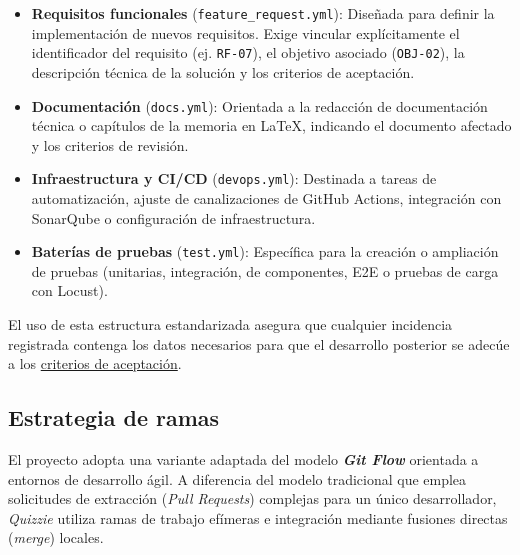 \begin{itemize}
    \item \textbf{Requisitos funcionales} (\texttt{feature\_request.yml}): Diseñada para definir la implementación de nuevos requisitos. Exige vincular explícitamente el identificador del requisito (ej. \texttt{RF-07}), el objetivo asociado (\texttt{OBJ-02}), la descripción técnica de la solución y los criterios de aceptación.
    \item \textbf{Documentación} (\texttt{docs.yml}): Orientada a la redacción de documentación técnica o capítulos de la memoria en \LaTeX{}, indicando el documento afectado y los criterios de revisión.
    \item \textbf{Infraestructura y CI/CD} (\texttt{devops.yml}): Destinada a tareas de automatización, ajuste de canalizaciones de GitHub Actions, integración con SonarQube o configuración de infraestructura.
    \item \textbf{Baterías de pruebas} (\texttt{test.yml}): Específica para la creación o ampliación de pruebas (unitarias, integración, de componentes, E2E o pruebas de carga con Locust).
\end{itemize}

El uso de esta estructura estandarizada asegura que cualquier incidencia registrada contenga los datos necesarios para que el desarrollo posterior se adecúe a los \hyperref[sub:criterios_de_aceptacion]{criterios de aceptación}.

\subsection{Estrategia de ramas}

El proyecto adopta una variante adaptada del modelo \textbf{\textit{Git Flow}} orientada a entornos de desarrollo ágil. A diferencia del modelo tradicional que emplea solicitudes de extracción (\textit{Pull Requests}) complejas para un único desarrollador, \textit{Quizzie} utiliza ramas de trabajo efímeras e integración mediante fusiones directas (\textit{merge}) locales.

